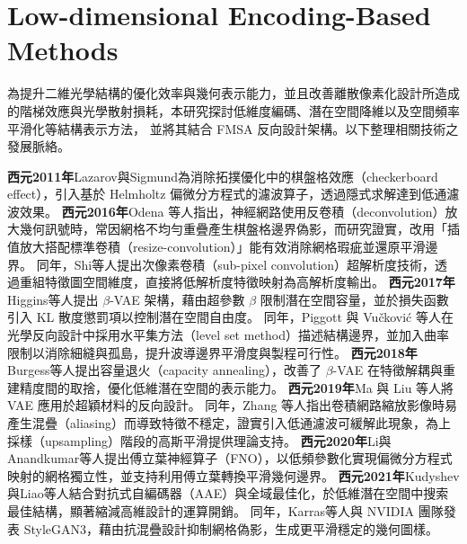 \section{Low-dimensional Encoding-Based Methods}

為提升二維光學結構的優化效率與幾何表示能力，並且改善離散像素化設計所造成的階梯效應與光學散射損耗，本研究探討低維度編碼、潛在空間降維以及空間頻率平滑化等結構表示方法，
並將其結合 FMSA 反向設計架構。以下整理相關技術之發展脈絡。\

\cite{lazarov2011_filters}\textbf{西元2011年}Lazarov與Sigmund為消除拓撲優化中的棋盤格效應（checkerboard effect），引入基於 Helmholtz 偏微分方程式的濾波算子，透過隱式求解達到低通濾波效果。
\cite{odena2016_deconvolution}\textbf{西元2016年}Odena 等人指出，神經網路使用反卷積（deconvolution）放大幾何訊號時，常因網格不均勻重疊產生棋盤格邊界偽影，而研究證實，改用「插值放大搭配標準卷積（resize-convolution）」能有效消除網格瑕疵並還原平滑邊界。
同年，\cite{shi2016_subpixel_cnn}Shi等人提出次像素卷積（sub-pixel convolution）超解析度技術，透過重組特徵圖空間維度，直接將低解析度特徵映射為高解析度輸出。
\textbf{西元2017年}\cite{higgins2017_betavae}Higgins等人提出 $\beta$-VAE 架構，藉由超參數 $\beta$ 限制潛在空間容量，並於損失函數引入 KL 散度懲罰項以控制潛在空間自由度。
同年，\cite{piggott2017_fabrication}Piggott 與 Vučković 等人在光學反向設計中採用水平集方法（level set method）描述結構邊界，並加入曲率限制以消除細縫與孤島，提升波導邊界平滑度與製程可行性。
\textbf{西元2018年}\cite{burgess2018_understanding_betavae}Burgess等人提出容量退火（capacity annealing），改善了 $\beta$-VAE 在特徵解耦與重建精度間的取捨，優化低維潛在空間的表示能力。
\textbf{西元2019年}\cite{ma2019_probabilistic}Ma 與 Liu 等人將 VAE 應用於超穎材料的反向設計。
同年，\cite{zhang2019_shift_invariant}Zhang 等人指出卷積網路縮放影像時易產生混疊（aliasing）而導致特徵不穩定，證實引入低通濾波可緩解此現象，為上採樣（upsampling）階段的高斯平滑提供理論支持。
\textbf{西元2020年}\cite{li2020_fourier_neural_operator}Li與Anandkumar等人提出傅立葉神經算子（FNO），以低頻參數化實現偏微分方程式映射的網格獨立性，並支持利用傅立葉轉換平滑幾何邊界。
\textbf{西元2021年}\cite{kudyshev2021_machine_learning}Kudyshev與Liao等人結合對抗式自編碼器（AAE）與全域最佳化，於低維潛在空間中搜索最佳結構，顯著縮減高維設計的運算開銷。
同年，\cite{karras2021_alias_free}Karras等人與 NVIDIA 團隊發表 StyleGAN3，藉由抗混疊設計抑制網格偽影，生成更平滑穩定的幾何圖樣。


